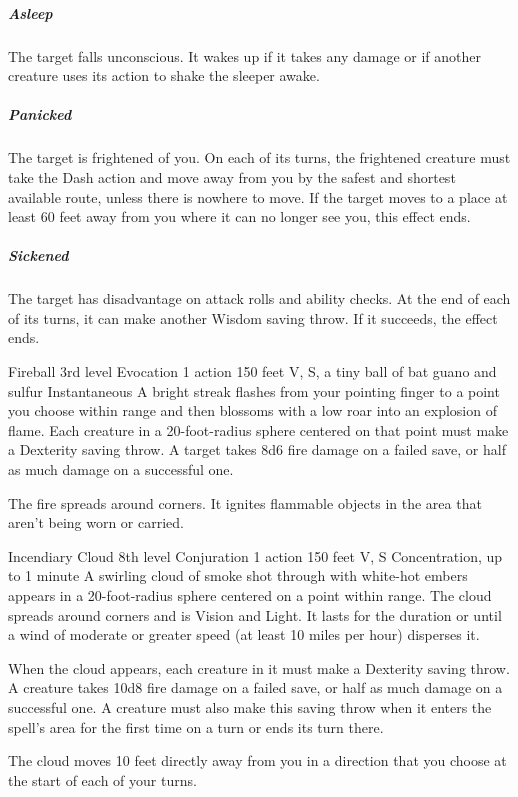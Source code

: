 \documentclass[10pt,a4paper,twoside,bg=print,twocolumn,openany,nodeprecatedcode]{dndbook}
\begin{document}
\subparagraph{Asleep}
The target falls unconscious. It wakes up if it takes any damage or if another creature uses its action to shake the sleeper awake.

\subparagraph{Panicked}
The target is frightened of you. On each of its turns, the frightened creature must take the Dash action and move away from you by the safest and shortest available route, unless there is nowhere to move. If the target moves to a place at least 60 feet away from you where it can no longer see you, this effect ends.

\subparagraph{Sickened}
The target has disadvantage on attack rolls and ability checks. At the end of each of its turns, it can make another Wisdom saving throw. If it succeeds, the effect ends.



\DndSpellHeader%
{Fireball}
{3rd level Evocation}
{1 action}
{150 feet}
{V, S, a tiny ball of bat guano and sulfur}
{Instantaneous}
A bright streak flashes from your pointing finger to a point you choose within range and then blossoms with a low roar into an explosion of flame. Each creature in a 20-foot-radius sphere centered on that point must make a Dexterity saving throw. A target takes 8d6 fire damage on a failed save, or half as much damage on a successful one.

The fire spreads around corners. It ignites flammable objects in the area that aren't being worn or carried.



\DndSpellHeader%
{Incendiary Cloud}
{8th level Conjuration}
{1 action}
{150 feet}
{V, S}
{Concentration, up to 1 minute}
A swirling cloud of smoke shot through with white-hot embers appears in a 20-foot-radius sphere centered on a point within range. The cloud spreads around corners and is Vision and Light. It lasts for the duration or until a wind of moderate or greater speed (at least 10 miles per hour) disperses it.

When the cloud appears, each creature in it must make a Dexterity saving throw. A creature takes 10d8 fire damage on a failed save, or half as much damage on a successful one. A creature must also make this saving throw when it enters the spell's area for the first time on a turn or ends its turn there.

The cloud moves 10 feet directly away from you in a direction that you choose at the start of each of your turns.
\end{document}
